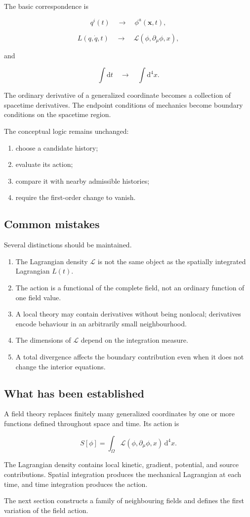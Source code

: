 The basic correspondence is

\[
q^{i}(t)
\quad\longrightarrow\quad
\phi^{a}(\mathbf{x},t),
\]

\[
L(q,\dot q,t)
\quad\longrightarrow\quad
\mathcal{L}(\phi,\partial_{\mu}\phi,x),
\]

and

\[
\int\mathrm{d}t
\quad\longrightarrow\quad
\int\mathrm{d}^{4}x.
\]

The ordinary derivative of a generalized coordinate becomes a collection of spacetime derivatives. The endpoint conditions of mechanics become boundary conditions on the spacetime region.

The conceptual logic remains unchanged:

\begin{enumerate}
    \item choose a candidate history;
    \item evaluate its action;
    \item compare it with nearby admissible histories;
    \item require the first-order change to vanish.
\end{enumerate}

\subsection{Common mistakes}

Several distinctions should be maintained.

\begin{enumerate}
    \item The Lagrangian density \(\mathcal{L}\) is not the same object as the spatially integrated Lagrangian \(L(t)\).
    \item The action is a functional of the complete field, not an ordinary function of one field value.
    \item A local theory may contain derivatives without being nonlocal; derivatives encode behaviour in an arbitrarily small neighbourhood.
    \item The dimensions of \(\mathcal{L}\) depend on the integration measure.
    \item A total divergence affects the boundary contribution even when it does not change the interior equations.
\end{enumerate}

\subsection{What has been established}

A field theory replaces finitely many generalized coordinates by one or more functions defined throughout space and time. Its action is

\[
S[\phi]
=
\int_{\Omega}
\mathcal{L}(\phi,\partial_{\mu}\phi,x)
\,\mathrm{d}^{4}x.
\]

The Lagrangian density contains local kinetic, gradient, potential, and source contributions. Spatial integration produces the mechanical Lagrangian at each time, and time integration produces the action.

The next section constructs a family of neighbouring fields and defines the first variation of the field action.